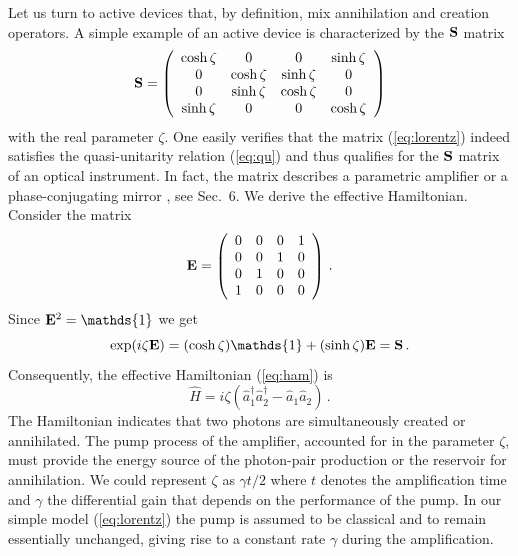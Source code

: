 \documentclass[12pt,amsmath,amssymb]{article}
\def\underline#1{{\bf #1}}
\numberwithin{equation}{section}
\begin{document}
Let us turn to active devices that, by definition, mix
annihilation and creation operators.
A simple example of an active device
is characterized by the $\underline{S}$ matrix
\begin{equation}
\label{eq:lorentz} \underline{S} =
    \left(
    \begin{array}{cccc}
      \cosh\zeta&0&0&\sinh\zeta\\ 0&\cosh\zeta&\sinh\zeta&0\\
      0&\sinh\zeta&\cosh\zeta&0\\ \sinh\zeta&0&0&\cosh\zeta
    \end{array}
\right)
\end{equation}
with the real parameter $\zeta$. One easily verifies that the
matrix (\ref{eq:lorentz}) indeed satisfies the quasi-unitarity relation
(\ref{eq:qu}) and thus qualifies for the $\underline{S}$ matrix
of an optical instrument. In fact, the matrix describes a
parametric amplifier \cite{Shen} or a phase-conjugating mirror
\cite{Shen}, see Sec.\ 6. We derive the effective Hamiltonian.
Consider the matrix
\begin{equation}
\underline{E} =
    \left(
    \begin{array}{cccc}
      0&0&0&1\\0&0&1&0\\0&1&0&0\\1&0&0&0
    \end{array}
\right) \,.
\end{equation}
Since $\underline{E}^2 = \mathds{1}$ we get
\begin{equation}
\exp(i\zeta\underline{E}) = (\cosh\zeta)\mathds{1} + (\sinh\zeta)
\underline{E} = \underline{S} \,.
\end{equation}
Consequently, the effective Hamiltonian (\ref{eq:ham}) is
\begin{equation}
\label{eq:hamp} \hat{H} = i\zeta\left(
\hat{a}_1^\dagger\hat{a}_2^\dagger-\hat{a}_1\hat{a}_2 \right) \,.
\end{equation}
The Hamiltonian indicates that two photons are simultaneously
created or annihilated. The pump process of the amplifier,
accounted for in the parameter $\zeta$, must provide the energy
source of the photon-pair production or the reservoir for
annihilation. We could represent $\zeta$ as $\gamma t /2$ where
$t$ denotes the amplification time and $\gamma$ the differential
gain that depends on the performance of the pump. In our simple
model (\ref{eq:lorentz}) the pump is assumed to be classical and
to remain essentially unchanged, giving rise to a constant rate
$\gamma$ during the amplification.
\end{document}

